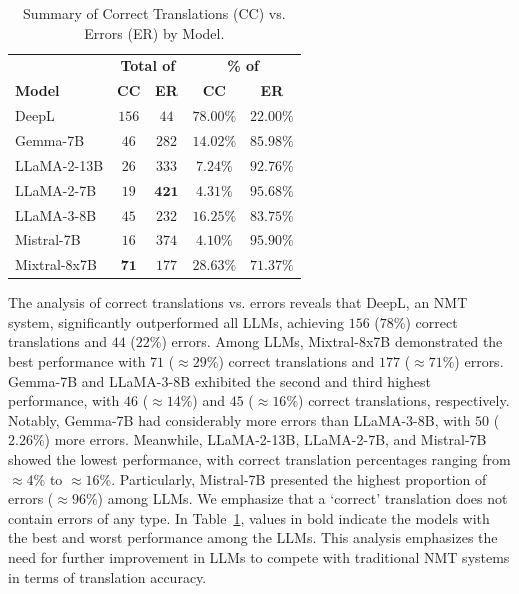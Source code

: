 \begin{table}[htb]
\centering
\begin{tabular}{lcccc}
\toprule
& \multicolumn{2}{c}{\textbf{Total of}} & \multicolumn{2}{c}{\textbf{\% of}} \\
\cmidrule(lr){2-3} \cmidrule(lr){4-5}
\textbf{Model} & \textbf{CC} & \textbf{ER} & \textbf{CC} & \textbf{ER} \\
\midrule
DeepL & $156$ & $44$ & $78.00\%$ & $22.00\%$ \\
\midrule
Gemma-7B & $46$ & $282$ & $14.02\%$ & $85.98\%$ \\
LLaMA-2-13B & $26$ & $333$ & $7.24\%$ & $92.76\%$ \\
LLaMA-2-7B & $19$ & $\mathbf{421}$ & $4.31\%$ & $95.68\%$ \\
LLaMA-3-8B & $45$ & $232$ & $16.25\%$ & $83.75\%$ \\
Mistral-7B & $16$ & $374$ & $4.10\%$ & $\mathbf{95.90\%}$ \\
Mixtral-8x7B & $\mathbf{71}$ & $177$ & $\mathbf{28.63}\%$ & $71.37\%$ \\
\bottomrule
\end{tabular}
\caption{Summary of Correct Translations (CC) vs. Errors (ER) by Model.}
\label{tab:corrects_errors_summary}
\end{table}


The analysis of correct translations vs. errors reveals that DeepL, an NMT system, significantly outperformed all LLMs, achieving $156$ ($78\%$) correct translations and $44$ ($22\%$) errors. Among LLMs, Mixtral-8x7B demonstrated the best performance with $71$ ($\approx29\%$) correct translations and $177$ ($\approx71\%$) errors. Gemma-7B and LLaMA-3-8B exhibited the second and third highest performance, with $46$ ($\approx14\%$) and $45$ ($\approx16\%$) correct translations, respectively. Notably, Gemma-7B had considerably more errors than LLaMA-3-8B, with $50$ ($2.26\%$) more errors. Meanwhile, LLaMA-2-13B, LLaMA-2-7B, and Mistral-7B showed the lowest performance, with correct translation percentages ranging from $\approx4\%$ to $\approx16\%$. Particularly, Mistral-7B presented the highest proportion of errors ($\approx96\%$) among LLMs. We emphasize that a `correct' translation does not contain errors of any type. In Table~\ref{tab:corrects_errors_summary}, values in bold indicate the models with the best and worst performance among the LLMs. This analysis emphasizes the need for further improvement in LLMs to compete with traditional NMT systems in terms of translation accuracy.


